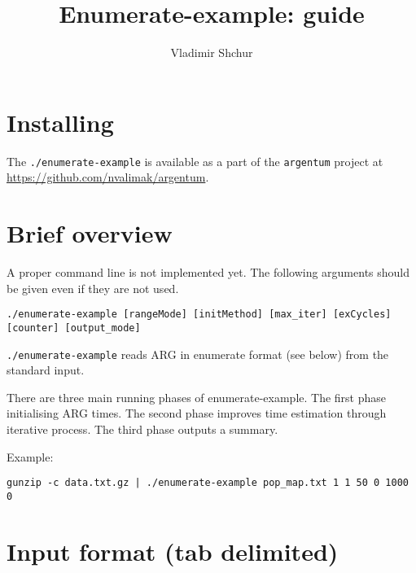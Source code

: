 \documentclass[11pt]{amsart}
\newcommand{\PBWT}{\mathcal{PBWT}}
\theoremstyle{definition}
\theoremstyle{remark}
\begin{document}
\title{Enumerate-example: guide}
\author{Vladimir Shchur }
\address{vlshchur@gmail.com}
\maketitle





\section{Installing}
	The \texttt{./enumerate-example} is available as a part of the \texttt{argentum} project at \url{https://github.com/nvalimak/argentum}.

\section{Brief overview}

	A proper command line is not implemented yet. The following arguments should be given even if they are not used.
	\begin{displayquote}
		\texttt{./enumerate-example  [rangeMode] [initMethod] [max\_iter] [exCycles] [counter] [output\_mode]}
	\end{displayquote}

	\texttt{./enumerate-example} reads ARG in enumerate format (see below) from the standard input.

	There are three main running phases of enumerate-example. The first phase initialising ARG times. The second phase improves time estimation through iterative process. The third phase outputs a summary.

	Example:
	\begin{displayquote}
		\texttt{gunzip -c data.txt.gz | ./enumerate-example pop\_map.txt 1 1 50 0 1000 0}
	\end{displayquote}

\section{Input format (tab delimited)}
\end{document}
